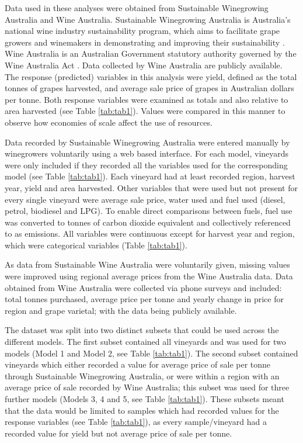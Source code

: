 \documentclass[review,12pt,authoryear]{elsarticle}
\begin{document}
\begin{linenumbers}
Data used in these analyses were obtained from Sustainable Winegrowing Australia and Wine Australia. Sustainable Winegrowing Australia is Australia's national wine industry sustainability program, which aims to facilitate grape  growers and winemakers in demonstrating and improving their sustainability \citep{swaSustainableWingrowingAustralia2022}. Wine Australia is an Australian Government statutory authority governed by the Wine Australia Act \citep{attorney-generalsdepartmentWineAustraliaCorporation2010}. Data collected by Wine Australia are publicly available. The response (predicted) variables in this analysis were yield, defined as the total tonnes of grapes harvested, and average sale price of grapes in Australian dollars per tonne. Both response variables were examined as totals and also relative to area harvested (see Table \ref{tab:tab1}). Values were compared in this manner to observe how economies of scale affect the use of resources.
\par
Data recorded by Sustainable Winegrowing Australia were entered manually by winegrowers voluntarily using a web based interface. For each model, vineyards were only included if they recorded all the variables used for the corresponding model (see Table \ref{tab:tab1}). Each vineyard had at least recorded region, harvest year, yield and area harvested. Other variables that were used but not present for every single vineyard were average sale price, water used and fuel used (diesel, petrol, biodiesel and LPG). To enable direct comparisons between fuels, fuel use was converted to tonnes of carbon dioxide equivalent and collectively referenced to as emissions. All variables were continuous except for harvest year and region, which were categorical variables (Table \ref{tab:tab1}).
\par
As data from Sustainable Wine Australia were voluntarily given, missing values were improved using regional average prices from the Wine Australia data. Data obtained from Wine Australia were collected via phone surveys and included: total tonnes purchased, average price per tonne and yearly change in price for region and grape varietal; with the data being publicly available.
\par
The dataset was split into two distinct subsets that could be used across the different models. The first subset contained all vineyards and was used for two models (Model 1 and Model 2, see Table \ref{tab:tab1}). The second subset contained vineyards which either recorded a value for average price of sale per tonne through Sustainable Winegrowing Australia, or were within a region with an average price of sale recorded by Wine Australia; this subset was used for three further models (Models 3, 4 and 5, see Table \ref{tab:tab1}). These subsets meant that the data would be limited to samples which had recorded values for the response variables (see Table \ref{tab:tab1}), as every sample/vineyard had a recorded value for yield but not average price of sale per tonne.

\end{linenumbers}
\end{document}

